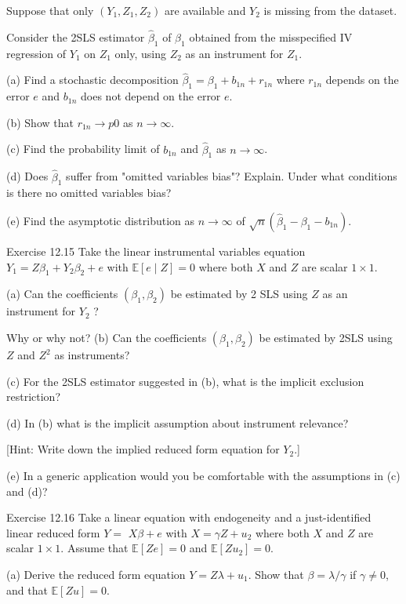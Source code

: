 \documentclass[10pt]{article}
\begin{document}
Suppose that only $\left(Y_{1}, Z_{1}, Z_{2}\right)$ are available and $Y_{2}$ is missing from the dataset.

Consider the 2SLS estimator $\widehat{\beta}_{1}$ of $\beta_{1}$ obtained from the misspecified IV regression of $Y_{1}$ on $Z_{1}$ only, using $Z_{2}$ as an instrument for $Z_{1}$.

(a) Find a stochastic decomposition $\widehat{\beta}_{1}=\beta_{1}+b_{1 n}+r_{1 n}$ where $r_{1 n}$ depends on the error $e$ and $b_{1 n}$ does not depend on the error $e$.

(b) Show that $r_{1 n} \rightarrow p 0$ as $n \rightarrow \infty$.

(c) Find the probability limit of $b_{1 n}$ and $\widehat{\beta}_{1}$ as $n \rightarrow \infty$.

(d) Does $\widehat{\beta}_{1}$ suffer from "omitted variables bias"? Explain. Under what conditions is there no omitted variables bias?

(e) Find the asymptotic distribution as $n \rightarrow \infty$ of $\sqrt{n}\left(\widehat{\beta}_{1}-\beta_{1}-b_{1 n}\right)$.

Exercise 12.15 Take the linear instrumental variables equation $Y_{1}=Z \beta_{1}+Y_{2} \beta_{2}+e$ with $\mathbb{E}[e \mid Z]=0$ where both $X$ and $Z$ are scalar $1 \times 1$.

(a) Can the coefficients $\left(\beta_{1}, \beta_{2}\right)$ be estimated by 2 SLS using $Z$ as an instrument for $Y_{2}$ ?

Why or why not? (b) Can the coefficients $\left(\beta_{1}, \beta_{2}\right)$ be estimated by 2SLS using $Z$ and $Z^{2}$ as instruments?

(c) For the 2SLS estimator suggested in (b), what is the implicit exclusion restriction?

(d) In (b) what is the implicit assumption about instrument relevance?

[Hint: Write down the implied reduced form equation for $Y_{2}$.]

(e) In a generic application would you be comfortable with the assumptions in (c) and (d)?

Exercise 12.16 Take a linear equation with endogeneity and a just-identified linear reduced form $Y=$ $X \beta+e$ with $X=\gamma Z+u_{2}$ where both $X$ and $Z$ are scalar $1 \times 1$. Assume that $\mathbb{E}[Z e]=0$ and $\mathbb{E}\left[Z u_{2}\right]=0$.

(a) Derive the reduced form equation $Y=Z \lambda+u_{1}$. Show that $\beta=\lambda / \gamma$ if $\gamma \neq 0$, and that $\mathbb{E}[Z u]=0$.
\end{document}

